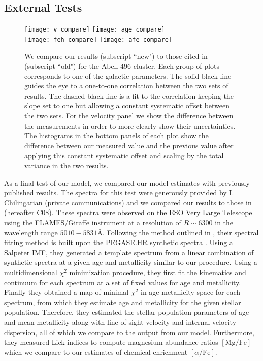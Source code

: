\documentclass[twocolumn]{aastex6}
\def\afe{[\alpha/\mathrm{Fe}]}
\begin{document}
\subsection{External Tests}
\label{External Tests}

\begin{figure}
\centering
\texttt{[image: v\_compare]}
\texttt{[image: age\_compare]}\\
\texttt{[image: feh\_compare]}
\texttt{[image: afe\_compare]}
\caption{We compare our results (subscript ``new") to those cited in \citet{Chilingarian2008} (subscript ``old") for the Abell 496 cluster.  Each group of plots corresponds to one of the galactic parameters.  The solid black line guides the eye to a one-to-one correlation between the two sets of results.  The dashed black line is a fit to the correlation keeping the slope set to one but allowing a constant systematic offset between the two sets. For the velocity panel we show the difference between the measurements in order to more clearly show their uncertainties. The histograms in the bottom panels of each plot show the difference between our measured value and the previous value after applying this constant systematic offset and scaling by the total variance in the two results.}
\label{A496Compare}
\end{figure}

As a final test of our model,  we compared our model estimates with previously published results.
The spectra for this test were generously provided by I. Chilingarian (private communications) and we compared our results to those in \citet{Chilingarian2008} (hereafter C08).
These spectra were observed on the ESO Very Large Telescope using the FLAMES/Giraffe instrument at a resolution of $R\sim6300$ in the wavelength range $5010-5831$\AA.
Following the method outlined in \citet{Chilingarian2007}, their spectral fitting method is built upon the PEGASE.HR synthetic spectra \citep{LeBorgne2004}.
Using a Salpeter IMF, they generated a template spectrum from a linear combination of synthetic spectra at a given age and metallicity similar to our procedure.
Using a multidimensional $\chi^2$ minimization procedure, they first fit the kinematics and continuum for each spectrum at a set of fixed values for age and metallicity.
Finally they obtained a map of minimal $\chi^2$ in age-metallicity space for each spectrum, from which they estimate age and metallicity for the given stellar population.
Therefore, they estimated the stellar population parameters of age and mean metallicity along with line-of-sight velocity and internal velocity dispersion, all of which we compare to the output from our model.
Furthermore, they measured Lick indices to compute magnesium abundance ratios $\mathrm{[Mg/Fe]}$ which we compare to our estimates of chemical enrichment $\afe$.
\end{document}
